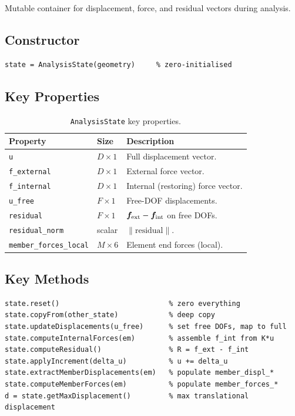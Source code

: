 Mutable container for displacement, force, and residual vectors during
analysis.

\subsection{Constructor}

\begin{lstlisting}
state = AnalysisState(geometry)     % zero-initialised
\end{lstlisting}

\subsection{Key Properties}

\begin{table}[H]
\centering
\caption{\texttt{AnalysisState} key properties.}
\begin{tabularx}{\textwidth}{llX}
\toprule
\textbf{Property} & \textbf{Size} & \textbf{Description} \\
\midrule
\texttt{u}             & $D\times1$ & Full displacement vector. \\
\texttt{f\_external}   & $D\times1$ & External force vector. \\
\texttt{f\_internal}   & $D\times1$ & Internal (restoring) force vector. \\
\texttt{u\_free}       & $F\times1$ & Free-DOF displacements. \\
\texttt{residual}      & $F\times1$ & $\bm{f}_{\text{ext}} - \bm{f}_{\text{int}}$ on free DOFs. \\
\texttt{residual\_norm}& scalar     & $\|\text{residual}\|$. \\
\texttt{member\_forces\_local} & $M\times6$ & Element end forces (local). \\
\bottomrule
\end{tabularx}
\end{table}

\subsection{Key Methods}

\begin{lstlisting}
state.reset()                          % zero everything
state.copyFrom(other_state)            % deep copy
state.updateDisplacements(u_free)      % set free DOFs, map to full
state.computeInternalForces(em)        % assemble f_int from K*u
state.computeResidual()                % R = f_ext - f_int
state.applyIncrement(delta_u)          % u += delta_u
state.extractMemberDisplacements(em)   % populate member_displ_*
state.computeMemberForces(em)          % populate member_forces_*
d = state.getMaxDisplacement()         % max translational displacement
\end{lstlisting}

